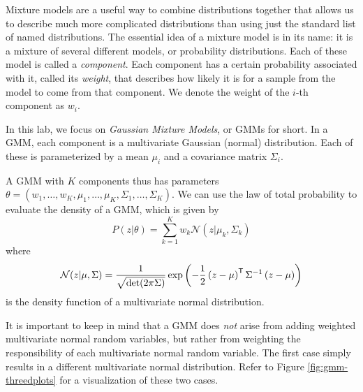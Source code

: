 Mixture models are a useful way to combine distributions together that allows us to describe much more complicated distributions than using just the standard list of named distributions.
The essential idea of a mixture model is in its name: it is a mixture of several different models, or probability distributions.
Each of these model is called a \emph{component}.
Each component has a certain probability associated with it, called its \emph{weight}, that describes how likely it is for a sample from the model to come from that component.
We denote the weight of the \(i\)-th component as \(w_i\).

In this lab, we focus on \emph{Gaussian Mixture Models}, or GMMs for short.
In a GMM, each component is a multivariate %
 Gaussian (normal) distribution.
Each of these is parameterized by a mean \(\mu_i\) and a covariance matrix \(\Sigma_i\).

A GMM with \(K\) components thus has parameters \(\theta = \left(w_1,\ldots,w_K, \mu_1,\ldots,\mu_K,\Sigma_1,\ldots,\Sigma_K\right)
\).
We can use the law of total probability to evaluate the density of a GMM, which is given by
\[
P(z | \theta) = \sum_{k=1}^{K} w_{k} \mathcal{N}(z | \mu_{k}, \Sigma_{k})
\]
where
\[
\mathcal{N}(z | \mu, \Sigma) = \frac{1}{\sqrt{\det(2\pi\Sigma)}} \exp\left({-\frac{1}{2} \left(z - \mu \right)^{\mathsf T}  \Sigma^{-1} \left(z - \mu\right)}\right)
\]
is the density function of a multivariate normal distribution.

It is important to keep in mind that a GMM does \emph{not} arise from adding weighted multivariate normal random variables, but rather from weighting the responsibility of each multivariate normal random variable.
The first case simply results in a different multivariate normal distribution. %
Refer to Figure \ref{fig:gmm-threedplots} for a visualization of these two cases.

